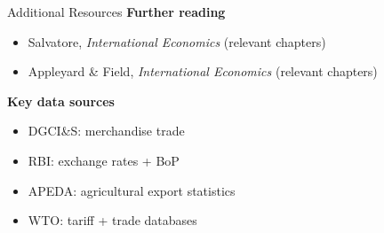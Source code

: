 \documentclass[
  ignorenonframetext,
  aspectratio=169,
]{beamer}
\makeatletter
\providecommand{\tightlist}{%
  \setlength{\itemsep}{0pt}\setlength{\parskip}{0pt}}
\let\quarto@originallabel\label
\DeclareRobustCommand*{\label}[1]{\quarto@originallabel{#1}}
\makeatother
\begin{document}
\begin{frame}{Additional Resources}
\label{additional-resources}
\textbf{Further reading}

\begin{itemize}
\tightlist
\item
  Salvatore, \emph{International Economics} (relevant chapters)
\item
  Appleyard \& Field, \emph{International Economics} (relevant chapters)
\end{itemize}

\textbf{Key data sources}

\begin{itemize}
\tightlist
\item
  DGCI\&S: merchandise trade
\item
  RBI: exchange rates + BoP
\item
  APEDA: agricultural export statistics
\item
  WTO: tariff + trade databases
\end{itemize}
\end{frame}
\end{document}
